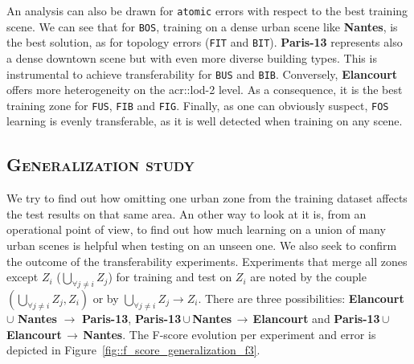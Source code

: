         An analysis can also be drawn for \texttt{atomic} errors with respect to the best training scene.
        We can see that for \texttt{BOS}, training on a dense urban scene like \textbf{Nantes}, is the best solution, as for topology errors (\texttt{FIT} and \texttt{BIT}).
        \textbf{Paris-13} represents also a dense downtown scene but with even more diverse building types.
        This is instrumental to achieve transferability for \texttt{BUS} and \texttt{BIB}.
        Conversely, \textbf{Elancourt} offers more heterogeneity on the \gls{acr::lod}-2 level.
        As a consequence, it is the best training zone for \texttt{FUS}, \texttt{FIB} and \texttt{FIG}.
        Finally, as one can obviously suspect, \texttt{FOS} learning is evenly transferable, as it is well detected when training on any scene.

    \subsection{\textsc{Generalization study}}
        \label{subsec::more_experiments::scalability::generalization}
        We try to find out how omitting one urban zone from the training dataset affects the test results on that same area.
        An other way to look at it is, from an operational point of view, to find out how much learning on a union of many urban scenes is helpful when testing on an unseen one.
        We also seek to confirm the outcome of the transferability experiments.
        Experiments that merge all zones except $Z_i$ ($\underset{\forall j \neq i}{\bigcup} Z_j$) for training and test on $Z_i$ are noted by the couple $(\underset{\forall j \neq i}{\bigcup} Z_j, Z_i)$ or by $ \underset{\forall j \neq i}{\bigcup} Z_j \rightarrow Z_i$.
        There are three possibilities: \textbf{Elancourt} $\cup$ \textbf{Nantes} $\rightarrow$ \textbf{Paris-13}, \mbox{\textbf{Paris-13}}\,$\cup$\,\textbf{Nantes}\,$\rightarrow$\,\textbf{Elancourt} and \mbox{\textbf{Paris-13}}\,$\cup$\,\textbf{Elancourt}\,$\rightarrow$\,\textbf{Nantes}.
        The F-score evolution per experiment and error is depicted in Figure~\ref{fig::f_score_generalization_f3}.\\
    
